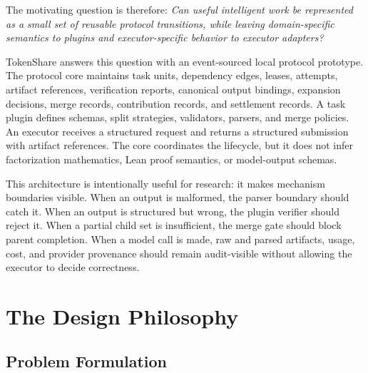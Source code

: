 \documentclass{article}
\theoremstyle{plain}
\begin{document}
{\color{blue}
The motivating question is therefore: \emph{Can useful intelligent work be represented as a small set of reusable protocol transitions, while leaving domain-specific semantics to plugins and executor-specific behavior to executor adapters?}

TokenShare answers this question with an event-sourced local protocol prototype. The protocol core maintains task units, dependency edges, leases, attempts, artifact references, verification reports, canonical output bindings, expansion decisions, merge records, contribution records, and settlement records. A task plugin defines schemas, split strategies, validators, parsers, and merge policies. An executor receives a structured request and returns a structured submission with artifact references. The core coordinates the lifecycle, but it does not infer factorization mathematics, Lean proof semantics, or model-output schemas.

This architecture is intentionally useful for research: it makes mechanism boundaries visible. When an output is malformed, the parser boundary should catch it. When an output is structured but wrong, the plugin verifier should reject it. When a partial child set is insufficient, the merge gate should block parent completion. When a model call is made, raw and parsed artifacts, usage, cost, and provider provenance should remain audit-visible without allowing the executor to decide correctness.
}

\section{The Design Philosophy}
\subsection{Problem Formulation}
\end{document}
